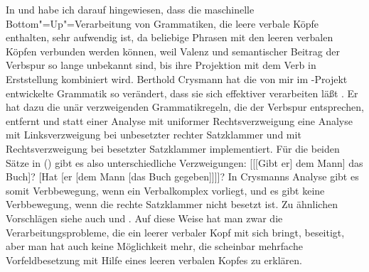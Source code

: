In  und  habe ich darauf hingewiesen,
dass die maschinelle Bottom"=Up"=Verarbeitung von Grammatiken, die leere verbale Köpfe enthalten, sehr aufwendig
ist, da beliebige Phrasen mit den leeren verbalen Köpfen verbunden werden können, weil
Valenz und semantischer Beitrag der Verbspur so lange unbekannt sind, bis ihre Projektion
mit dem Verb in Erststellung kombiniert wird. 
%
Berthold Crysmann hat die von mir im \verbmobil-Projekt
entwickelte Grammatik \citep{MK2000a} so verändert, dass sie sich effektiver verarbeiten läßt \citep{Crysmann2003b}.
Er hat dazu die unär verzweigenden Grammatikregeln, die der Verbspur entsprechen, entfernt und statt einer
Analyse mit uniformer Rechtsverzweigung eine Analyse mit Linksverzweigung bei unbesetzter
rechter Satzklammer und mit Rechtsverzweigung bei besetzter Satzklammer implementiert.
Für die beiden Sätze in () gibt es also unterschiedliche Verzweigungen:
\eal
\ex {}[[[Gibt er] dem Mann] das Buch]?
\ex {}[Hat [er [dem Mann [das Buch gegeben]]]]?
\zl
In Crysmanns Analyse gibt es somit Verbbewegung, wenn ein Verbalkomplex vorliegt, und es
gibt keine Verbbewegung, wenn die rechte Satzklammer nicht besetzt ist.
Zu ähnlichen Vorschlägen siehe auch  und .
Auf diese Weise hat man zwar die Verarbeitungsprobleme, die ein leerer verbaler Kopf mit sich
bringt, beseitigt, aber man hat auch keine Möglichkeit mehr, die scheinbar mehrfache
Vorfeldbesetzung mit Hilfe eines leeren verbalen Kopfes zu erklären.

